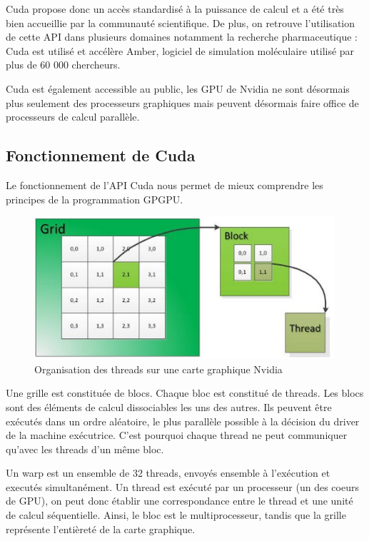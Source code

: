 \documentclass{report}
\begin{document}
Cuda propose donc un accès standardisé à la puissance de calcul et a été très bien accueillie par la communauté scientifique. De plus, on retrouve l'utilisation de cette API dans plusieurs domaines notamment la recherche pharmaceutique : Cuda est utilisé et accélère Amber, logiciel de simulation moléculaire utilisé par plus de 60 000 chercheurs.\newline

Cuda est également accessible au public, les GPU de Nvidia ne sont désormais plus seulement des processeurs graphiques mais peuvent désormais faire office de processeurs de calcul parallèle. \newline

\subsection{Fonctionnement de Cuda}

Le fonctionnement de l'API Cuda nous permet de mieux comprendre les principes de la programmation GPGPU. \newline

\begin{figure}[!h]
\begin{center}
\includegraphics[height=150pt]{images_finales/image_cuda.png}
\end{center}
\caption{Organisation des threads sur une carte graphique Nvidia}
\label{test3}
\end{figure}

Une grille est constituée de blocs. Chaque bloc est constitué de threads. Les blocs sont des éléments de calcul dissociables les uns des autres. Ils peuvent être exécutés dans un ordre aléatoire, le plus parallèle possible à la décision du driver de la machine exécutrice. C'est pourquoi chaque thread ne peut communiquer qu'avec les threads d'un même bloc.\newline

Un warp est un ensemble de 32 threads, envoyés ensemble à l'exécution et executés simultanément. Un thread est exécuté par un processeur (un des coeurs de GPU), on peut donc établir une correspondance entre le thread et une unité de calcul séquentielle.\newline
Ainsi, le bloc est le multiprocesseur, tandis que la grille représente l'entièreté de la carte graphique. \newline
\end{document}
